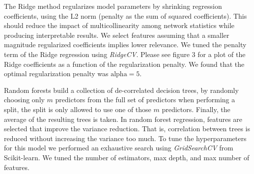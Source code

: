 \documentclass[12pt]{article}
\begin{document}
The Ridge method regularizes model parameters by shrinking regression coefficients, using the L2 norm (penalty as the sum of squared coefficients). This should reduce the impact of multicollinearity among network statistics while producing interpretable results. We select features assuming that a smaller magnitude regularized coefficients implies lower relevance. We tuned the penalty term of the Ridge regression using \textit{RidgeCV}. Please see figure 3 for a plot of the Ridge coefficients as a function of the regularization penalty. We found that the optimal regularization penalty was $\text{alpha} = 5$.

\clearpage
Random forests build a collection of de-correlated decision trees, by randomly choosing only $m$ predictors from the full set of predictors when performing a split, the split is only allowed to use one of those $m$ predictors. Finally, the average of the resulting trees is taken. In random forest regression, features are selected that improve the variance reduction. That is, correlation between trees is reduced without increasing the variance too much. To tune the hyperparameters for this model we performed an exhaustive search using \textit{GridSearchCV} from Scikit-learn. We tuned the number of estimators, max depth, and max number of features. 
\end{document}
